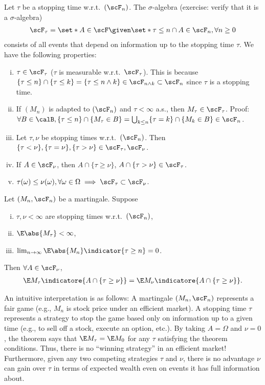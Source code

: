 \documentclass[../aipt.tex]{subfiles}
\begin{document}
Let $\tau$ be a stopping time w.r.t.\ $(\scF_n)$. The $\sigma$-algebra (exercise: verify that it is a $\sigma$-algebra)
\begin{align*}
\scF_\tau = \set*{A \in \scF\given \set*{\tau \leq n} \cap A \in \scF_n, \forall n \geq 0}
\end{align*}
consists of all events that depend on information up to the stopping time $\tau$. We have the following properties:
\begin{enumerate}[(i)]
\item $\tau \in \scF_\tau$ ($\tau$ is measurable w.r.t.\ $\scF_\tau$). This is because $\{\tau \leq n\} \cap \{\tau \leq k\} = \{\tau \leq n \wedge k\} \in \scF_{n \wedge k} \subset \scF_n$ since $\tau$ is a stopping time.
\item If $(M_n)$ is adapted to $(\scF_n)$ and $\tau<\infty$ a.s., then $M_\tau \in \scF_\tau$.
Proof: $\forall B \in \calB, \{\tau \leq n\} \cap \{M_\tau \in B\} = \bigcup_{k \leq n} \{\tau =k\} \cap \{M_k \in B\} \in \scF_n$.
\item Let $\tau, \nu$ be stopping times w.r.t.\ $(\scF_n)$. Then $\{\tau < \nu\}, \{\tau = \nu\}, \{\tau > \nu\} \in \scF_\tau, \scF_\nu$.
\item If $A \in \scF_\nu$, then $A \cap \{\tau \geq \nu\}$,  $A \cap \{\tau > \nu\} \in \scF_\tau$.
\item $\tau(\omega) \leq \nu(\omega), \forall \omega \in \Omega \implies \scF_\tau \subset \scF_\nu$.
\end{enumerate}
%
\begin{Theorem} \label{wk13:thm:optional_stopping}
Let $(M_n, \scF_n)$ be a martingale. Suppose
\begin{enumerate}[(i)]
\item $\tau, \nu < \infty$ are stopping times w.r.t.\ $(\scF_n)$,
\item $\E \abs{M_\tau} < \infty$,
\item $\lim_{n \to \infty} \E \abs{M_n} \indicator{\tau \geq n} = 0$.
\end{enumerate}
Then $\forall A \in \scF_\nu$, 
\begin{align*}
\E M_\tau \indicatore{A \cap \{\tau \geq \nu\}} = \E M_\nu \indicatore{A \cap \{\tau \geq \nu\}}.
\end{align*}
\end{Theorem}
An intuitive interpretation is as follows: A martingale $(M_n,\scF_n)$ represents a fair game (e.g., $M_n$ is stock price under an efficient market). A stopping time $\tau$ represents a strategy to stop the game based only on information up to a given time (e.g., to sell off a stock, execute an option, etc.). By taking $A=\Omega$ and $\nu=0$, the theorem says that $\E M_\tau = \E M_0$ for any $\tau$ satisfying the theorem conditions. Thus, there is no ``winning strategy'' in an efficient market! Furthermore, given any two competing strategies $\tau$ and $\nu$, there is no advantage $\nu$ can gain over $\tau$ in terms of expected wealth even on events it has full information about. 
\end{document}
